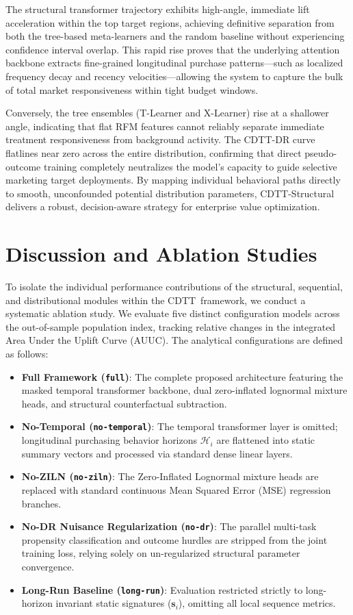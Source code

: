 \documentclass[10pt, conference]{IEEEtran}
\newcommand{\ourmodel}{CDTT}
\begin{document}
The structural transformer trajectory exhibits high-angle, immediate lift acceleration within the top target regions, achieving definitive separation from both the tree-based meta-learners and the random baseline without experiencing confidence interval overlap. This rapid rise proves that the underlying attention backbone extracts fine-grained longitudinal purchase patterns—such as localized frequency decay and recency velocities—allowing the system to capture the bulk of total market responsiveness within tight budget windows. 

Conversely, the tree ensembles (T-Learner and X-Learner) rise at a shallower angle, indicating that flat RFM features cannot reliably separate immediate treatment responsiveness from background activity. The \ourmodel-DR curve flatlines near zero across the entire distribution, confirming that direct pseudo-outcome training completely neutralizes the model's capacity to guide selective marketing target deployments. By mapping individual behavioral paths directly to smooth, unconfounded potential distribution parameters, \ourmodel-Structural delivers a robust, decision-aware strategy for enterprise value optimization.

\section{Discussion and Ablation Studies}
\label{sec:discussion}

To isolate the individual performance contributions of the structural, sequential, and distributional modules within the \ourmodel\ framework, we conduct a systematic ablation study. We evaluate five distinct configuration models across the out-of-sample population index, tracking relative changes in the integrated Area Under the Uplift Curve (AUUC). The analytical configurations are defined as follows:
\begin{itemize}
    \item \textbf{Full Framework (\texttt{full})}: The complete proposed architecture featuring the masked temporal transformer backbone, dual zero-inflated lognormal mixture heads, and structural counterfactual subtraction.
    \item \textbf{No-Temporal (\texttt{no-temporal})}: The temporal transformer layer is omitted; longitudinal purchasing behavior horizons $\mathcal{H}_i$ are flattened into static summary vectors and processed via standard dense linear layers.
    \item \textbf{No-ZILN (\texttt{no-ziln})}: The Zero-Inflated Lognormal mixture heads are replaced with standard continuous Mean Squared Error (MSE) regression branches.
    \item \textbf{No-DR Nuisance Regularization (\texttt{no-dr})}: The parallel multi-task propensity classification and outcome hurdles are stripped from the joint training loss, relying solely on un-regularized structural parameter convergence.
    \item \textbf{Long-Run Baseline (\texttt{long-run})}: Evaluation restricted strictly to long-horizon invariant static signatures ($\mathbf{s}_i$), omitting all local sequence metrics.
\end{itemize}
\end{document}
